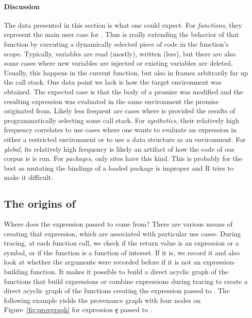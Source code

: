 \documentclass[screen,acmsmall]{acmart}
\begin{document}
\paragraph{Discussion}
The data presented in this section is what one could expect. For {\it
  functions}, they represent the main user case for \eval. Thus \eval is really
extending the behavior of that function by executing a dynamically selected
piece of code in the function's scope. Typically, variables are read (mostly),
written (less), but there are also some cases where new variables are injected
or existing variables are deleted. Usually, this happens in the current
function, but also in frames arbitrarily far up the call stack. One data point
we lack is how the target environment was obtained. The expected case is that
the body of a promise was modified and the resulting expression was evaluated in
the same environment the promise originated from. Likely less frequent are cases
where \eval is provided the results of programmatically selecting some call
stack. For {\it synthetics}, their relatively high frequency correlates to use
cases where one wants to evaluate an expression in either a restricted
environment or to use a data structure as an environment. For {\it global}, its
relatively high frequency is likely an artifact of how the code of our corpus is
is run. For {\it packages}, only \packageNbPackageNamespaceEnvSites sites have
this kind. This is probably for the best as mutating the bindings of
a loaded package is improper and R tries to make it difficult.

\subsection{The origins of \eval}

Where does the expression passed to \eval come from? There are various means of
creating that expression, which are associated with particular use cases. During tracing, at each function call, we check if the return value is an expression or a symbol, or if the function is a function of interest. If it is, we record it and also look at whether the arguments were recorded before if it is not an expression-building function. It makes it possible to build a direct acyclic graph of the functions that build expressions or combine expressions during tracing to create a direct acyclic graph of the functions creating the expression passed to \eval. The following example yields the provenance graph with four nodes on Figure~\ref{fig:provgraph} for expression \c{e} passed to \eval.
\end{document}
